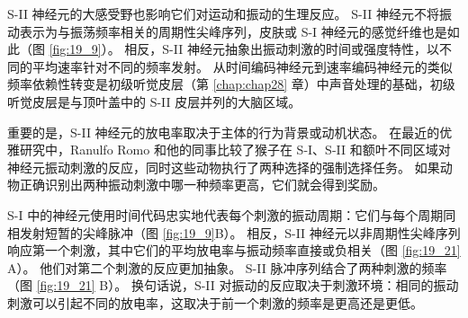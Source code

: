 S-II 神经元的大感受野也影响它们对运动和振动的生理反应。 
S-II 神经元不将振动表示为与振荡频率相关的周期性尖峰序列，皮肤或 S-I 神经元的感觉纤维也是如此（图 \ref{fig:19_9}）。 
相反，S-II 神经元抽象出振动刺激的时间或强度特性，以不同的平均速率针对不同的频率发射。 
从时间编码神经元到速率编码神经元的类似频率依赖性转变是初级听觉皮层（第 \ref{chap:chap28} 章）中声音处理的基础，初级听觉皮层是与顶叶盖中的 S-II 皮层并列的大脑区域。


重要的是，S-II 神经元的放电率取决于主体的行为背景或动机状态。 
在最近的优雅研究中，Ranulfo Romo 和他的同事比较了猴子在 S-I、S-II 和额叶不同区域对神经元振动刺激的反应，同时这些动物执行了两种选择的强制选择任务。 
如果动物正确识别出两种振动刺激中哪一种频率更高，它们就会得到奖励。


S-I 中的神经元使用时间代码忠实地代表每个刺激的振动周期：它们与每个周期同相发射短暂的尖峰脉冲（图 \ref{fig:19_9}B）。 
相反，S-II 神经元以非周期性尖峰序列响应第一个刺激，其中它们的平均放电率与振动频率直接或负相关（图 \ref{fig:19_21} A）。 
他们对第二个刺激的反应更加抽象。 S-II 脉冲序列结合了两种刺激的频率（图 \ref{fig:19_21} B）。
换句话说，S-II 对振动的反应取决于刺激环境：相同的振动刺激可以引起不同的放电率，这取决于前一个刺激的频率是更高还是更低。


